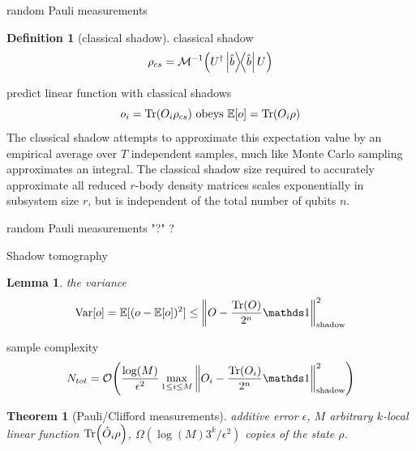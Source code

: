 \documentclass[
10pt,
aps,
pra,
linenumbers,
floatfix,
]{revtex4-2}
\theoremstyle{plain}
\newtheorem{theorem}{Theorem}
\newtheorem{lemma}{Lemma}
\theoremstyle{definition}
\newtheorem{definition}{Definition}
\newtheorem{remark}{Remark}
\newcommand{\shadow}{\text{shadow}}
\newcommand{\ob}{\hat{O}}
\newcommand{\dm}{\rho}
\begin{document}
random Pauli measurements
\begin{definition}[classical shadow]\label{def:classical_shadow}
	classical shadow
	\begin{equation}
		\dm_{cs} = \mathcal{M}^{-1} \qty(U^\dagger \op{\hat{b}} U)
	\end{equation}
\end{definition}
predict linear function with classical shadows
\begin{equation}
	o_i = \Tr(O_i \dm_{cs})
	\text{ obeys }
	\expectation[o] =\Tr(O_i \dm)
\end{equation}
The classical shadow attempts to approximate this expectation value by an empirical average over $T$ independent samples, much like Monte Carlo sampling approximates an integral.
The classical shadow size required to accurately approximate all reduced $r$-body density matrices scales exponentially in subsystem size $r$, but is independent of the total number of qubits $n$.

\begin{algorithm}[H]
    \DontPrintSemicolon
    \Input{a density matrix $\dm$, ..}
    \BlankLine
     {
        random Pauli measurements 
    {\Return "?"}
    }
    \Return ?
    \caption{Shadow tomography}
    \label{alg:classical_shadow}
\end{algorithm}
\begin{lemma}
	the variance
	\begin{equation}
		\variance[o] = \expectation[(o-\expectation[o])^2]
		\le \norm{O - \frac{\Tr(O)}{2^n} \identity}^2_{\shadow}
	\end{equation}
\end{lemma}
sample complexity
\begin{equation}
	N_{tot} = \bigO \qty(
		\frac{\log (M)}{\epsilon^2} \max_{1\le i\le M} 
		\norm{O_i - \frac{\Tr(O_i)}{2^n} \identity}^2_{\shadow}
	)
\end{equation}
\begin{theorem}[Pauli/Clifford measurements]
	additive error $\epsilon$, $M$ arbitrary $k$-local linear function $\Tr(\ob_i\dm)$,
	$\Omega(\log(M) 3^k/\epsilon^2)$ copies of the state $\dm$.
\end{theorem}
\end{document}
